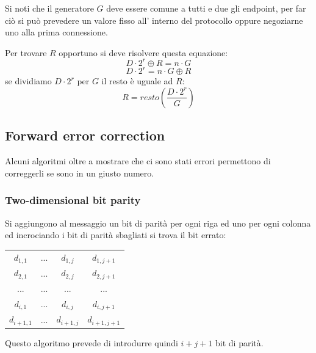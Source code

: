 Si noti che il generatore $G$ deve essere comune a tutti e due gli endpoint, per far ciò si può prevedere un valore fisso all' interno del protocollo oppure negoziarne uno alla prima connessione.

Per trovare $R$ opportuno si deve risolvere questa equazione:
$$ D \cdot 2^{r} \oplus R = n \cdot G $$
$$ D \cdot 2^{r} = n \cdot G \oplus R $$
se dividiamo $D \cdot 2^r$ per $G$ il resto è uguale ad $R$:
$$ R = resto\left( \frac{D \cdot 2^r}{G} \right) $$

\subsection{Forward error correction}
Alcuni algoritmi oltre a mostrare che ci sono stati errori permettono di correggerli se sono in un giusto numero.

\subsubsection{Two-dimensional bit parity}
Si aggiungono al messaggio un bit di parità per ogni riga ed uno per ogni colonna ed incrociando i bit di parità sbagliati si trova il bit errato:
\begin{table}[ht!]
    \centering
    \begin{tabular}{c c c | c}
        $d_{1,1}$ & ... & $d_{1,j}$ & $d_{1,j+1}$ \\
        $d_{2,1}$ & ... & $d_{2,j}$ & $d_{2,j+1}$ \\
        ... & ... & ... & ... \\
        $d_{i,1}$ & ... & $d_{i,j}$ & $d_{i,j+1}$ \\
        \hline
        $d_{i+1,1}$ & ... & $d_{i+1,j}$ & $d_{i+1,j+1}$ \\
    \end{tabular}
\end{table}
Questo algoritmo prevede di introdurre quindi $i + j + 1$ bit di parità.

